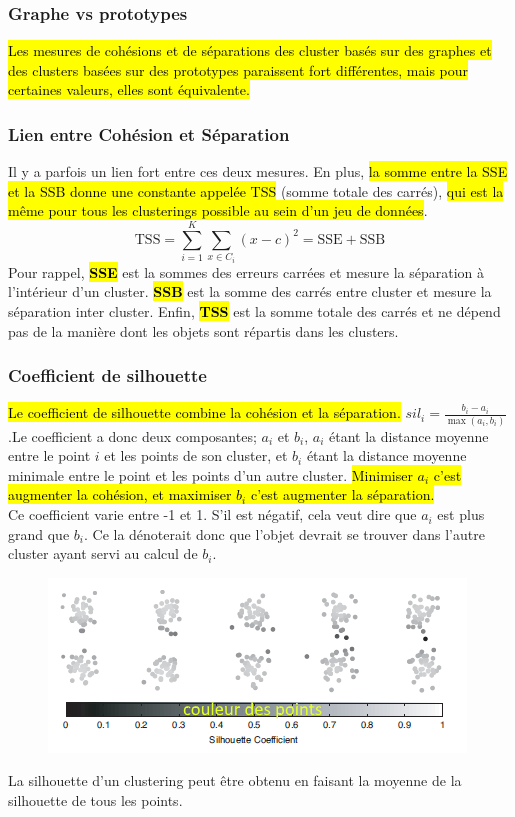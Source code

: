 \documentclass[letterpaper, 12pt]{article}
\newcommand{\alinea}{
\hspace*{0.5cm}}
\begin{document}
			\subsubsection{Graphe vs prototypes}
				\alinea \hl{Les mesures de cohésions et de séparations des 
					cluster basés sur des graphes et des clusters 
					basées sur des prototypes paraissent fort différentes,
					mais pour certaines valeurs, elles sont équivalente.}
			\subsubsection{Lien entre Cohésion et Séparation}
				\alinea Il y a parfois un lien fort entre ces deux
					mesures. En plus, \hl{la somme entre la SSE et la SSB
					donne une constante appelée TSS} (somme totale des
					carrés), \hl{qui est la même pour tous les 
					clusterings possible au sein d'un jeu de données}.
					$$ \text{TSS} = \sum_{i=1}^{K} \sum_{x \in C_i} (x - c)^2
						   = \text{SSE} + \text{SSB} $$
					Pour rappel, \hl{\textbf{SSE}} est la 
					sommes des erreurs carrées et 
					mesure la séparation à l'intérieur 
					d'un cluster. \hl{\textbf{SSB}}
					est la somme des carrés entre cluster et mesure la
					séparation inter cluster. Enfin, 
					\hl{\textbf{TSS}} est la somme 
					totale des carrés et ne dépend pas de la manière
					dont les objets sont répartis dans les clusters.
			\subsubsection{Coefficient de silhouette}
				\alinea \hl{Le coefficient de silhouette combine la cohésion
					et la séparation.} $sil_i = \frac{b_i - a_i}%
					{\max(a_i, b_i)}$ .Le coefficient a donc deux composantes;
					$a_i$ et $b_i$, $a_i$ étant la distance 
					moyenne entre le point $i$ et les points de son cluster, 
					et $b_i$ étant la distance moyenne minimale 
					entre le point et les points d'un autre cluster.
					\hl{Minimiser $a_i$ c'est augmenter la cohésion,
					et maximiser $b_i$ c'est augmenter la séparation.}\\
				\alinea	Ce coefficient varie entre -1 et 1.
					S'il est négatif, cela veut dire que $a_i$ est 
					plus grand que $b_i$.
					Ce la dénoterait donc que l'objet devrait se trouver
					dans l'autre cluster ayant servi au calcul de $b_i$.\\
				\begin{figure}[H]
					\centering
					\includegraphics[scale=1.0]{Images/silhouette.png}
					\caption{}
					\label{fig:eval:silhouette}
				\end{figure}\noindent
				La silhouette d'un clustering peut être obtenu en faisant
				la moyenne de la silhouette de tous les points.
\end{document}
